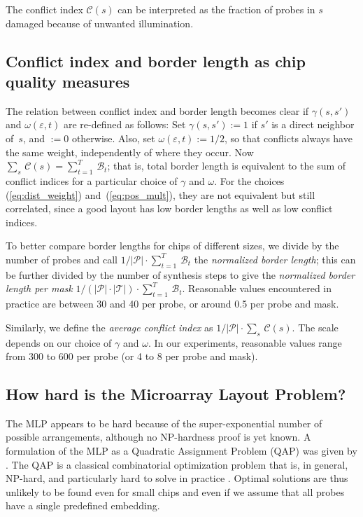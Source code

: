 \documentclass{w-edbk}
\newcommand{\eps}{\varepsilon}
\begin{document}
The conflict index $\mathcal{C}(s)$ can be interpreted as the fraction of
probes in $s$ damaged because of unwanted illumination.


\subsection{Conflict index and border length as chip quality measures}

The relation between conflict index and border length becomes clear if
$\gamma(s,s')$ and $\omega(\eps,t)$ are re-defined as follows: Set
$\gamma(s,s') := 1$ if $s'$ is a direct neighbor of~$s$, and $:=0$ otherwise.
Also, set $\omega(\eps,t) := 1/2$, so that conflicts always have the same
weight, independently of where they occur. Now $\sum_s\, \mathcal{C}(s) =
\sum_{t=1}^T\, \mathcal{B}_t$; that is, total border length is equivalent to
the sum of conflict indices for a particular choice of $\gamma$ and $\omega$.
For the choices (\ref{eq:dist_weight}) and~(\ref{eq:pos_mult}), they are not
equivalent but still correlated, since a good layout has low border lengths as
well as low conflict indices.

To better compare border lengths for chips of different sizes, we
divide by the number of probes and call $1/|\mathcal{P}| \cdot
\sum_{t=1}^T\, \mathcal{B}_t$ the \emph{normalized border length};
this can be further divided by the number of synthesis steps to give
the \emph{normalized border length per mask} $1/(|\mathcal{P}|\cdot
|\mathcal{T}|) \cdot \sum_{t=1}^T\, \mathcal{B}_t$. Reasonable values
encountered in practice are between 30 and 40 per probe, or around 0.5
per probe and mask.

Similarly, we define the \emph{average conflict index} as
$1/|\mathcal{P}| \cdot \sum_s\, \mathcal{C}(s)$. The scale depends on
our choice of $\gamma$ and $\omega$. In our experiments, reasonable
values range from 300 to 600 per probe (or 4 to 8 per probe and mask).


\subsection{How hard is the Microarray Layout Problem?}

The MLP appears to be hard because of the super-exponential number of possible
arrangements, although no NP-hardness proof is yet known. A formulation of the
MLP as a Quadratic Assignment Problem (QAP) was given by
\citet{Carvalho2006a}.  The QAP is a classical combinatorial optimization
problem that is, in general, NP-hard, and particularly hard to solve in
practice \citep{Cela1997}. Optimal solutions are thus unlikely to be found
even for small chips and even if we assume that all probes have a single
predefined embedding.
\end{document}
